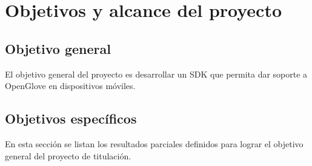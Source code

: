 \section{Objetivos y alcance del proyecto}

\subsection{Objetivo general}

El objetivo general del proyecto es desarrollar un SDK que permita dar soporte a OpenGlove en dispositivos móviles.


\subsection{Objetivos específicos}

En esta sección se listan los resultados parciales definidos para lograr el objetivo general del proyecto de titulación.

